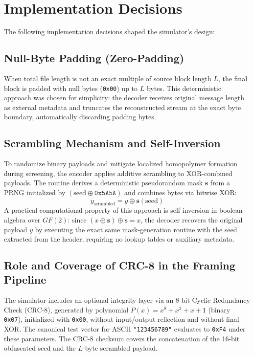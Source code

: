 \section{Implementation Decisions}
\label{sec:implementation_decisions}

The following implementation decisions shaped the simulator's design:

\subsection{Null-Byte Padding (Zero-Padding)}

When total file length is not an exact multiple of source block length $L$, the final block is padded with null bytes (\texttt{0x00}) up to $L$ bytes. This deterministic approach was chosen for simplicity: the decoder receives original message length as external metadata and truncates the reconstructed stream at the exact byte boundary, automatically discarding padding bytes.

\subsection{Scrambling Mechanism and Self-Inversion}

To randomize binary payloads and mitigate localized homopolymer formation during screening, the encoder applies additive scrambling to XOR-combined payloads. The routine derives a deterministic pseudorandom mask $\mathbf{s}$ from a PRNG initialized by $(\text{seed} \oplus \texttt{0x5A5A})$ and combines bytes via bitwise XOR:
\begin{equation}
    \label{eq:scramble}
    y_{\text{scrambled}} = y \oplus \mathbf{s}(\text{seed})
\end{equation}
A practical computational property of this approach is self-inversion in boolean algebra over $GF(2)$: since $(x \oplus \mathbf{s}) \oplus \mathbf{s} = x$, the decoder recovers the original payload $y$ by executing the exact same mask-generation routine with the seed extracted from the header, requiring no lookup tables or auxiliary metadata.

\subsection{Role and Coverage of CRC-8 in the Framing Pipeline}

The simulator includes an optional integrity layer via an 8-bit Cyclic Redundancy Check (CRC-8), generated by polynomial $P(x) = x^8 + x^2 + x + 1$ (binary \texttt{0x07}), initialized with \texttt{0x00}, without input/output reflection and without final XOR. The canonical test vector for ASCII \texttt{"123456789"} evaluates to \texttt{0xF4} under these parameters. The CRC-8 checksum covers the concatenation of the 16-bit obfuscated seed and the $L$-byte scrambled payload.


